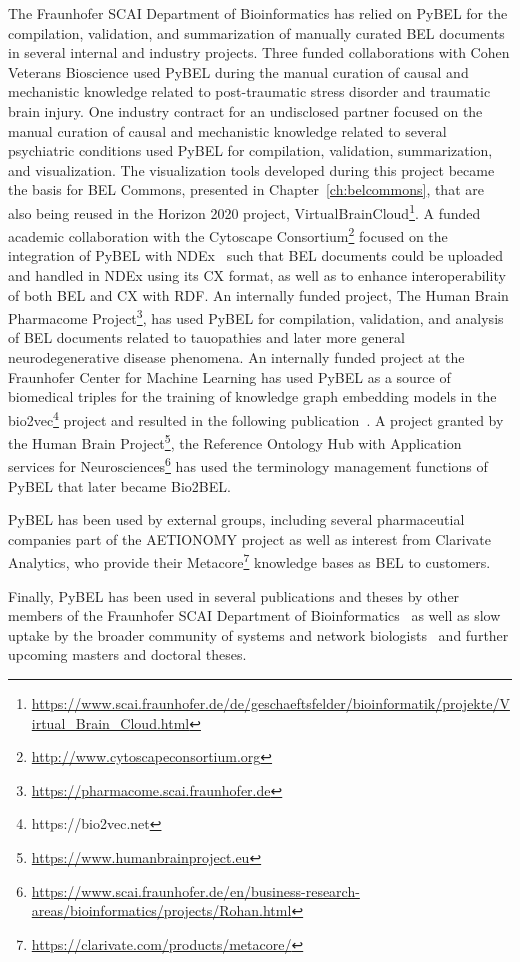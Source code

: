 The Fraunhofer SCAI Department of Bioinformatics has relied on PyBEL for the compilation, validation, and summarization of manually curated BEL documents in several internal and industry projects.
Three funded collaborations with Cohen Veterans Bioscience used PyBEL during the manual curation of causal and mechanistic knowledge related to post-traumatic stress disorder and traumatic brain injury.
One industry contract for an undisclosed partner focused on the manual curation of causal and mechanistic knowledge related to several psychiatric conditions used PyBEL for compilation, validation, summarization, and visualization.
The visualization tools developed during this project became the basis for BEL Commons, presented in Chapter~\ref{ch:belcommons}, that are also being reused in the Horizon 2020 project, VirtualBrainCloud\footnote{\url{https://www.scai.fraunhofer.de/de/geschaeftsfelder/bioinformatik/projekte/Virtual_Brain_Cloud.html}}.
A funded academic collaboration with the Cytoscape Consortium\footnote{\url{http://www.cytoscapeconsortium.org}} focused on the integration of PyBEL with NDEx~\cite{Pratt2015} such that BEL documents could be uploaded and handled in NDEx using its CX format, as well as to enhance interoperability of both \ac{BEL} and CX with \ac{RDF}.
An internally funded project, The Human Brain Pharmacome Project\footnote{\url{https://pharmacome.scai.fraunhofer.de}}, has used PyBEL for compilation, validation, and analysis of BEL documents related to tauopathies and later more general neurodegenerative disease phenomena.
An internally funded project at the Fraunhofer Center for Machine Learning has used PyBEL as a source of biomedical triples for the training of knowledge graph embedding models in the bio2vec\footnote{https://bio2vec.net} project and resulted in the following publication~\cite{Ali2019}.
A project granted by the Human Brain Project\footnote{\url{https://www.humanbrainproject.eu}}, the Reference Ontology Hub with Application services for Neurosciences\footnote{\url{https://www.scai.fraunhofer.de/en/business-research-areas/bioinformatics/projects/Rohan.html}} has used the terminology management functions of PyBEL that later became Bio2BEL\@.

PyBEL has been used by external groups, including several pharmaceutial companies part of the AETIONOMY project as well as interest from Clarivate Analytics, who provide their Metacore\footnote{\url{https://clarivate.com/products/metacore/}} knowledge bases as BEL to customers.

Finally, PyBEL has been used in several publications and theses by other members of the Fraunhofer SCAI Department of Bioinformatics~\cite{Domingo-Fernandez2018,Domingo-Fernandez2019a,Mubeen2019} as well as slow uptake by the broader community of systems and network biologists~\cite{Kwon2019,Gyori2017} and further upcoming masters and doctoral theses.
